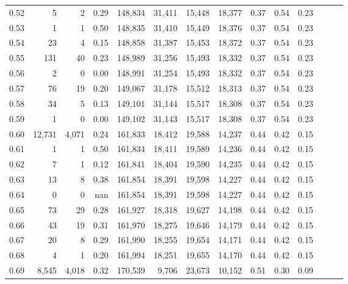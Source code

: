 \begin{tabular}{rrrrrrrrrrrrrr}
0.52 &       5 &      2 &  0.29 &  148,834 &   31,411 &  15,448 &  18,377 &  0.37 &  0.54 &      0.23 \\
0.53 &       1 &      1 &  0.50 &  148,835 &   31,410 &  15,449 &  18,376 &  0.37 &  0.54 &      0.23 \\
0.54 &      23 &      4 &  0.15 &  148,858 &   31,387 &  15,453 &  18,372 &  0.37 &  0.54 &      0.23 \\
0.55 &     131 &     40 &  0.23 &  148,989 &   31,256 &  15,493 &  18,332 &  0.37 &  0.54 &      0.23 \\
0.56 &       2 &      0 &  0.00 &  148,991 &   31,254 &  15,493 &  18,332 &  0.37 &  0.54 &      0.23 \\
0.57 &      76 &     19 &  0.20 &  149,067 &   31,178 &  15,512 &  18,313 &  0.37 &  0.54 &      0.23 \\
0.58 &      34 &      5 &  0.13 &  149,101 &   31,144 &  15,517 &  18,308 &  0.37 &  0.54 &      0.23 \\
0.59 &       1 &      0 &  0.00 &  149,102 &   31,143 &  15,517 &  18,308 &  0.37 &  0.54 &      0.23 \\
0.60 &  12,731 &  4,071 &  0.24 &  161,833 &   18,412 &  19,588 &  14,237 &  0.44 &  0.42 &      0.15 \\
0.61 &       1 &      1 &  0.50 &  161,834 &   18,411 &  19,589 &  14,236 &  0.44 &  0.42 &      0.15 \\
0.62 &       7 &      1 &  0.12 &  161,841 &   18,404 &  19,590 &  14,235 &  0.44 &  0.42 &      0.15 \\
0.63 &      13 &      8 &  0.38 &  161,854 &   18,391 &  19,598 &  14,227 &  0.44 &  0.42 &      0.15 \\
0.64 &       0 &      0 &   nan &  161,854 &   18,391 &  19,598 &  14,227 &  0.44 &  0.42 &      0.15 \\
0.65 &      73 &     29 &  0.28 &  161,927 &   18,318 &  19,627 &  14,198 &  0.44 &  0.42 &      0.15 \\
0.66 &      43 &     19 &  0.31 &  161,970 &   18,275 &  19,646 &  14,179 &  0.44 &  0.42 &      0.15 \\
0.67 &      20 &      8 &  0.29 &  161,990 &   18,255 &  19,654 &  14,171 &  0.44 &  0.42 &      0.15 \\
0.68 &       4 &      1 &  0.20 &  161,994 &   18,251 &  19,655 &  14,170 &  0.44 &  0.42 &      0.15 \\
0.69 &   8,545 &  4,018 &  0.32 &  170,539 &    9,706 &  23,673 &  10,152 &  0.51 &  0.30 &      0.09 \\

\end{tabular}
